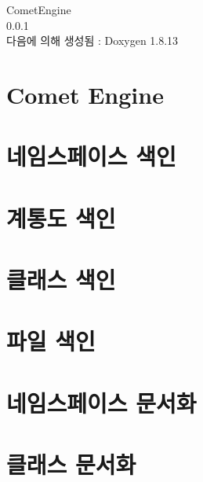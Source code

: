 \documentclass[twoside]{book}
\newcommand{\+}{\discretionary{\mbox{\scriptsize$\hookleftarrow$}}{}{}}
\newcommand{\clearemptydoublepage}{%
  \newpage{\pagestyle{empty}\cleardoublepage}%
}
\begin{document}
\hypersetup{pageanchor=false,
             bookmarksnumbered=true,
             pdfencoding=unicode
            }
\begin{titlepage}
\vspace*{7cm}
\begin{center}%
{\Large Comet\+Engine \\[1ex]\large 0.\+0.\+1 }\\
\vspace*{1cm}
{\large 다음에 의해 생성됨 \+:  Doxygen 1.8.13}\\
\end{center}
\end{titlepage}
\clearemptydoublepage
{}
\tableofcontents
\clearemptydoublepage
{}
\hypersetup{pageanchor=true}

\chapter{Comet Engine}
\label{md__r_e_a_d_m_e}

\chapter{네임스페이스 색인}

\chapter{계통도 색인}

\chapter{클래스 색인}

\chapter{파일 색인}

\chapter{네임스페이스 문서화}








\chapter{클래스 문서화}










\end{document}
